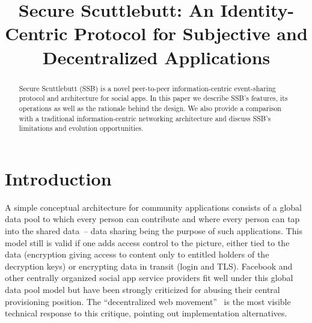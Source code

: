 \documentclass[9pt,sigconf,rewiew]{acmart}
\title{Secure Scuttlebutt: An Identity-Centric Protocol for Subjective and Decentralized Applications }
\begin{document}

\begin{abstract}
  Secure Scuttlebutt (SSB) is a novel peer-to-peer information-centric
  event-sharing protocol and architecture for social apps. In this
  paper we describe SSB's features, its operations as well as the
  rationale behind the design. We also provide a comparison with
  a traditional information-centric networking architecture and discuss
  SSB's limitations and evolution opportunities.


\end{abstract}

\maketitle


\section{Introduction}

A simple conceptual architecture for community applications consists
of a global data pool to which every person can contribute and where
every person can tap into the shared data~-- data sharing being the
purpose of such applications. This model still is valid if one adds
access control to the picture, either tied to the data (encryption
giving access to content only to entitled holders of the decryption
keys) or encrypting data in transit (login and TLS). Facebook and
other centrally organized social app service providers fit well under
this global data pool model but have been strongly criticized for
abusing their central provisioning position.  The ``decentralized web
movement''~\cite{decent-2018-aug} is the most visible technical
response to this critique, pointing out implementation alternatives.
\end{document}

